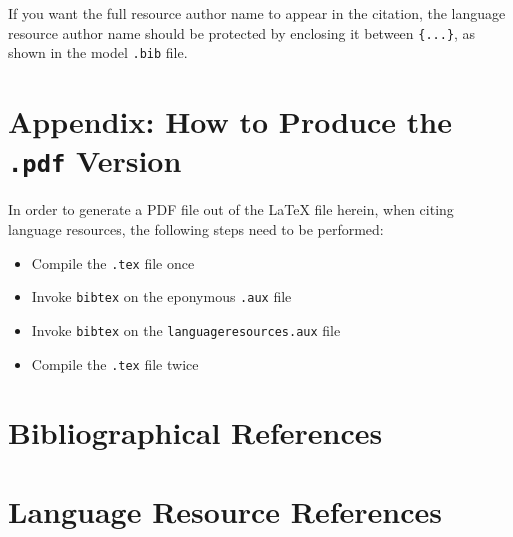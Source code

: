 \documentclass[10pt, a4paper]{article}
\begin{document}
If you want the full resource author name to appear in the citation, the
language resource author name should be protected by enclosing it between
\texttt{\{...\}}, as shown in the model \texttt{.bib} file.

\vspace{.3\baselineskip}

\section*{Appendix: How to Produce the \texttt{.pdf} Version}

In order to generate a PDF file out of the LaTeX file herein, when citing
language resources, the following steps need to be performed:

\begin{itemize}
    \item{Compile the \texttt{.tex} file once}
    \item{Invoke \texttt{bibtex} on the eponymous \texttt{.aux} file}
    \item{Invoke \texttt{bibtex} on the \texttt{languageresources.aux} file}
    \item{Compile the \texttt{.tex} file twice}
\end{itemize}

\section{Bibliographical References}
\label{main:ref}





\section{Language Resource References}
\label{lr:ref}
\end{document}
